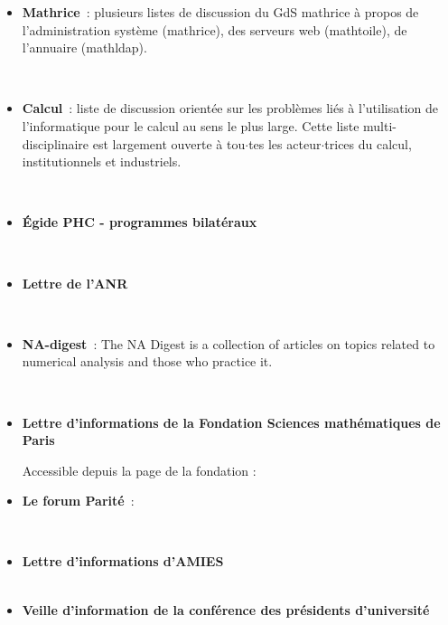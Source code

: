 \begin{itemize}
\\
\item {\bf Mathrice}~: plusieurs listes de discussion du GdS
mathrice \`a propos de l'administration syst\`eme (mathrice), des serveurs web
 (mathtoile), de l'annuaire (mathldap).

\\
\item {\bf Calcul}~: liste de discussion orient\'ee sur les
probl\`emes li\'es \`a l'utilisation de l'informatique pour le calcul au
sens le plus large. Cette liste multi-disciplinaire est largement
ouverte \`a tou$\cdot$tes les acteur$\cdot$trices du calcul, institutionnels et
industriels.

\\
%
\item{\bf \'Egide PHC  - programmes bilat\'eraux }

\\
\item{\bf Lettre de l'ANR}

\\
\item{\bf NA-digest}~:
The NA Digest is a collection of articles on topics related to numerical analysis and those who practice it.

\\
\item{\bf Lettre d'informations de la Fondation Sciences math\'ematiques de Paris}

Accessible depuis la page de la fondation : 
\\
\item {\bf Le forum Parit\'e}~:

\\
\item{\bf Lettre d'informations d'AMIES}
\\
\\
\item{\bf Veille d'information de la conf\'erence des pr\'esidents d'universit\'e}
\\
\end{itemize}
